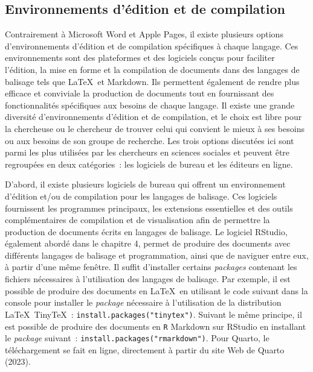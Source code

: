 \documentclass[
  letterpaper,
]{scrbook}
\begin{document}
\hypertarget{environnements-duxe9dition-et-de-compilation}{%
\subsection{Environnements d'édition et de
compilation}\label{environnements-duxe9dition-et-de-compilation}}

Contrairement à Microsoft Word et Apple Pages, il existe plusieurs
options d'environnements d'édition et de compilation spécifiques à
chaque langage. Ces environnements sont des plateformes et des logiciels
conçus pour faciliter l'édition, la mise en forme et la compilation de
documents dans des langages de balisage tels que \LaTeX~et Markdown. Ils
permettent également de rendre plus efficace et conviviale la production
de documents tout en fournissant des fonctionnalités spécifiques aux
besoins de chaque langage. Il existe une grande diversité
d'environnements d'édition et de compilation, et le choix est libre pour
la chercheuse ou le chercheur de trouver celui qui convient le mieux à
ses besoins ou aux besoins de son groupe de recherche. Les trois options
discutées ici sont parmi les plus utilisées par les chercheurs en
sciences sociales et peuvent être regroupées en deux catégories~: les
logiciels de bureau et les éditeurs en ligne.

D'abord, il existe plusieurs logiciels de bureau qui offrent un
environnement d'édition et/ou de compilation pour les langages de
balisage. Ces logiciels fournissent les programmes principaux, les
extensions essentielles et des outils complémentaires de compilation et
de visualisation afin de permettre la production de documents écrits en
langages de balisage. Le logiciel RStudio, également abordé dans le
chapitre 4, permet de produire des documents avec différents langages de
balisage et programmation, ainsi que de naviguer entre eux, à partir
d'une même fenêtre. Il suffit d'installer certains \emph{packages}
contenant les fichiers nécessaires à l'utilisation des langages de
balisage. Par exemple, il est possible de produire des documents en
\LaTeX~en utilisant le code suivant dans la console pour installer le
\emph{package} nécessaire à l'utilisation de la distribution
\LaTeX~Tiny\TeX~: \texttt{install.packages("tinytex")}. Suivant le même
principe, il est possible de produire des documents en \texttt{R}
Markdown sur RStudio en installant le \emph{package} suivant~:
\texttt{install.packages("rmarkdown")}. Pour Quarto, le téléchargement
se fait en ligne, directement à partir du site Web de Quarto (2023).
\end{document}
